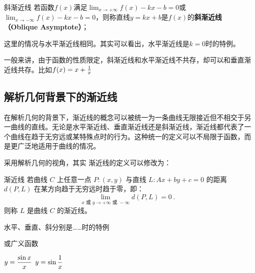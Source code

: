 \begin{definition}{斜渐近线}
若函数$f(x)$满足$\displaystyle \lim_{x\to +\infty}f(x)-kx-b=0$或$\displaystyle \lim_{x\to -\infty}f(x)-kx-b=0$，则称直线$y=kx+b$是$f(x)$的\textbf{斜渐近线（Oblique Asymptote）}；
\end{definition}

这里的情况与水平渐近线相同。其实可以看出，水平渐近线是$k=0$时的特例。

一般来讲，由于函数的性质限定，斜渐近线和水平渐近线不共存，却可以和垂直渐近线共存。比如$f(x)=x+{1\over x}$

\subsection{解析几何背景下的渐近线}

在解析几何的背景下，渐近线的概念可以被统一为一条曲线无限接近但不相交于另一曲线的直线。无论是水平渐近线、垂直渐近线还是斜渐近线，渐近线都代表了一个曲线在趋于无穷远或某特殊点时的行为。这种统一的定义可以不局限于函数，而是更广泛地适用于曲线的情况。

采用解析几何的视角，其实 渐近线的定义可以修改为：
\begin{definition}{渐近线}
若曲线  $C$  上任意一点  $P:(x, y)$  与直线  $L:Ax+by+c=0$  的距离  $d(P, L)$ 在某方向趋于无穷远时趋于零，即：
\begin{equation}
\lim_{x\text{ 或 }y \to +\infty \text{ 或 } -\infty} d(P, L) = 0~.
\end{equation}
则称  $L$  是曲线 $C$  的渐近线。
\end{definition}

水平、垂直、斜分别是……时的特例

或广义函数

$\displaystyle y={\sin x\over x}$
$\displaystyle y=\sin {1\over x}$